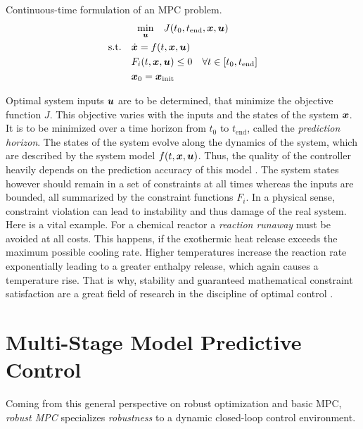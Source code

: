 \begin{definition} Continuous-time formulation of an MPC problem.
    \label{theory:def: general mpc}
    \[
        \begin{gathered}
            \underset{{\bm{u}}}{\min} \quad  J(t_0, t_\text{end}, {\bm{x}}, {\bm{u}}) \\
            \begin{aligned}
                \text{s.t.} \quad &\dot{{\bm{x}}} = f(t, {\bm{x}}, {\bm{u}}) \\
                & F_i(t, {\bm{x}}, {\bm{u}}) \leq 0 \quad \forall t \in [t_0, t_\text{end}] \\
                & {\bm{x}}_0 = {\bm{x}}_\text{init}
            \end{aligned}
        \end{gathered}
    \]
\end{definition}

Optimal system inputs ${\bm{u}}$ are to be determined, that minimize the objective function $J$. This objective
varies with the inputs and the states of the system ${\bm{x}}$. It is to be minimized over a time horizon
from $t_0$ to $t_\text{end}$, called the \emph{prediction horizon}. The states of the system evolve along
the dynamics of the system, which are described by the system model $f(t, {\bm{x}}, {\bm{u}})$. Thus, the quality
of the controller heavily depends on the prediction accuracy of this model \cite{lucia2013}.
The system states however should remain in a set of constraints at all times whereas the inputs
are bounded, all summarized by the constraint functions $F_i$. In a physical sense, constraint violation can lead to 
instability and thus damage of the real system. Here is a vital example.
For a chemical reactor a \emph{reaction runaway}
must be avoided at all costs. This happens, if the exothermic heat release exceeds the maximum possible
cooling rate. Higher temperatures increase the reaction rate exponentially leading to a greater 
enthalpy release, which again causes a temperature rise. That is why, stability and guaranteed mathematical constraint satisfaction
are a great field of research in the discipline of optimal control \cite{}.


\section{Multi-Stage Model Predictive Control}

Coming from this general perspective on robust optimization and basic MPC, \emph{robust MPC} specializes
\emph{robustness} to a dynamic closed-loop control environment. 

